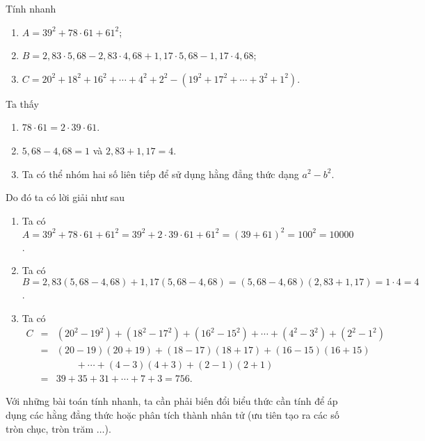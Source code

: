 \begin{vd}
	Tính nhanh
	\begin{enumerate}
		\item $ A=39^{2}+78\cdot 61+61^{2} $;
		\item $ B=2{,}83\cdot 5{,}68-2{,}83\cdot 4{,}68+1{,}17\cdot 5{,}68-1{,}17\cdot 4{,}68 $;
		\item $ C=20^{2}+18^{2}+16^{2}+\cdots+4^{2}+2^{2}-(19^{2}+17^{2}+\cdots+3^{2}+1^{2}) $.
	\end{enumerate}
	\loigiai
	{
		\begin{phantich}
			Ta thấy
			\begin{enumerate}
				\item $ 78\cdot 61=2\cdot 39\cdot 61 $.
				\item $ 5{,}68-4{,}68=1$ và $2{,}83+1{,}17=4 $.
				\item Ta có thể nhóm hai số liên tiếp để sử dụng hằng đẳng thức dạng $ a^{2}-b^{2} $.
			\end{enumerate}
		Do đó ta có lời giải như sau
		\end{phantich}
		\begin{enumerate}
			\item Ta có $ A=39^{2}+78\cdot 61+61^{2}=39^{2}+2\cdot 39\cdot 61+61^{2}=(39+61)^{2}=100^{2}=10000 $.
			\item Ta có $ B=2{,}83(5{,}68-4{,}68)+1{,}17(5{,}68-4{,}68)=(5{,}68-4{,}68)(2{,}83+1{,}17)=1\cdot 4=4 $.
			\item Ta có
			\begin{eqnarray*}
				C&=&(20^{2}-19^{2})+(18^{2}-17^{2})+(16^{2}-15^{2})+\cdots+(4^{2}-3^{2})+(2^{2}-1^{2})\\
				&=&(20-19)(20+19)+(18-17)(18+17)+(16-15)(16+15)\\
				&&\qquad+\cdots+(4-3)(4+3)+(2-1)(2+1)\\
				&=&39+35+31+\cdots+7+3=756.
			\end{eqnarray*}
		\end{enumerate}
		\begin{note}
			Với những bài toán tính nhanh, ta cần phải biến đổi biểu thức cần tính để áp dụng các hằng đẳng thức hoặc phân tích thành nhân tử (ưu tiên tạo ra các số tròn chục, tròn trăm $\ldots$).
		\end{note}
	}
\end{vd}
